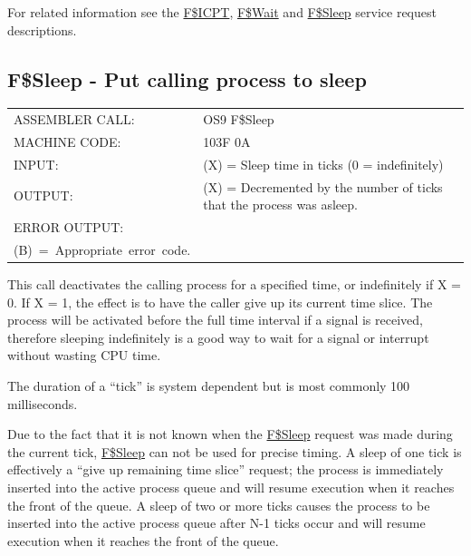 \documentclass[
]{article}
\newcounter{none} %
\begin{document}
For related information see the \hyperref[f.icpt]{F\$ICPT},
\hyperref[f.wait]{F\$Wait} and \hyperref[f.sleep]{F\$Sleep} service
request descriptions.

\subsection{F\$Sleep - Put calling process to sleep}\label{f.sleep}

{\def\LTcaptype{none} %
\begin{longtable}[]{@{}
  >{\raggedright\arraybackslash}p{}
  >{\raggedright\arraybackslash}p{}@{}}
\toprule\noalign{}
\endhead
\bottomrule\noalign{}
\endlastfoot
ASSEMBLER CALL: & OS9 F\$Sleep \\
MACHINE CODE: & 103F 0A \\
INPUT: & (X) = Sleep time in ticks (0 = indefinitely) \\
OUTPUT: & (X) = Decremented by the number of ticks that the process was
asleep. \\
ERROR OUTPUT: & \begin{minipage}[t]{\linewidth}\raggedright
(CC)~=~C~bit~set.\\
(B)~=~Appropriate~error~code.
\end{minipage} \\
\end{longtable}
}

This call deactivates the calling process for a specified time, or
indefinitely if X = 0. If X = 1, the effect is to have the caller give
up its current time slice. The process will be activated before the full
time interval if a signal is received, therefore sleeping indefinitely
is a good way to wait for a signal or interrupt without wasting CPU
time.

The duration of a ``tick'' is system dependent but is most commonly 100
milliseconds.

Due to the fact that it is not known when the
\hyperref[f.sleep]{F\$Sleep} request was made during the current tick,
\hyperref[f.sleep]{F\$Sleep} can not be used for precise timing. A sleep
of one tick is effectively a ``give up remaining time slice'' request;
the process is immediately inserted into the active process queue and
will resume execution when it reaches the front of the queue. A sleep of
two or more ticks causes the process to be inserted into the active
process queue after N-1 ticks occur and will resume execution when it
reaches the front of the queue.
\end{document}
